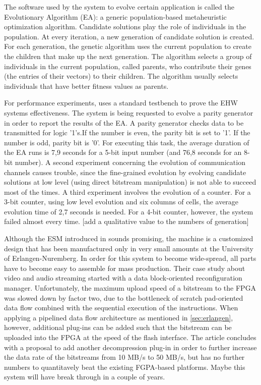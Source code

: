 
The software used by the system to evolve certain application is called the Evolutionary Algorithm (EA): a generic population-based metaheuristic optimization algorithm. Candidate solutions play the role of individuals in the population. At every iteration, a new generation of candidate solution is created. For each generation, the genetic algorithm uses the current population to create the children that make up the next generation. The algorithm selects a group of individuals in the current population, called parents, who contribute their genes (the entries of their vectors) to their children. The algorithm usually selects individuals that have better fitness values as parents. 

For performance experiments, \cite{virtex4} uses a standard testbench to prove the EHW systems effectiveness. The system is being requested to evolve a parity generator in order to report the results of the EA. A parity generator checks data to be transmitted for logic '1's.If the number is even, the parity bit is set to '1'. If the number is odd, parity bit is '0'. For executing this task, the average duration of the EA runs is 7,9 seconds for a 5-bit input number (and 76,8 seconds for an 8-bit number). A second experiment concerning the evolution of communication channels causes trouble, since the fine-grained evolution by evolving candidate solutions at low level (using direct bitstream manipulation) is not able to succeed most of the times. A third experiment involves the evolution of a counter. For a 3-bit counter, using low level evolution and six columns of cells, the average evolution time of 2,7 seconds is needed. For a 4-bit counter, however, the system failed almost every time. [add a qualitative value to the numbers of generation]

Although the ESM introduced in \cite{erlangen} sounds promising, the machine is a customized design that has been manufactured only in very small amounts at the University of Erlangen-Nuremberg. In order for this system to become wide-spread, all parts have to become easy to assemble for mass production. Their case study about video and audio streaming started with a data block-oriented reconfiguration manager. Unfortunately, the maximum upload speed of a bitstream to the FPGA was slowed down by factor two, due to the bottleneck of scratch pad-oriented data flow combined with the sequential execution of the instructions. When applying a pipelined data flow architecture as mentioned in \ref{sec:erlangen}, however, additional plug-ins can be added such that the bitstream can be uploaded into the FPGA at the speed of the flash interface. The article concludes with a proposal to add another decompression plug-in in order to further increase the data rate of the bitstreams from 10 MB/s to 50 MB/s, but has no further numbers to quantitavely beat the existing FGPA-based platforms. Maybe this system will have break through in a couple of years.

